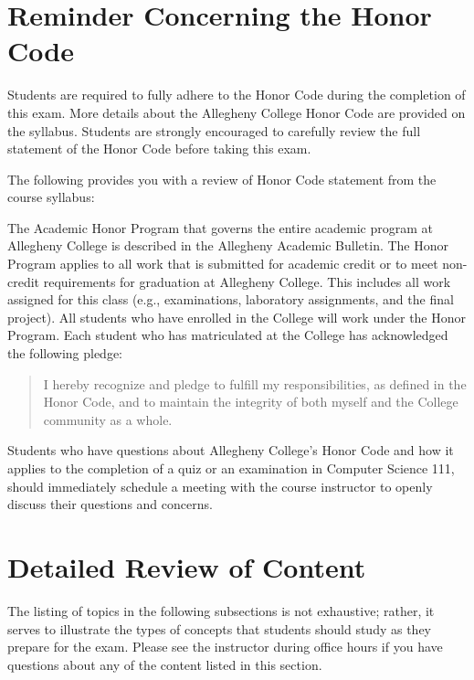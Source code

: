 \documentclass[11pt]{article}
\begin{document}
\section*{Reminder Concerning the Honor Code}

\noindent Students are required to fully adhere to the Honor Code during the completion of this exam. More details about
the Allegheny College Honor Code are provided on the syllabus. Students are strongly encouraged to carefully review the
full statement of the Honor Code before taking this exam.

\noindent The following provides you with a review of Honor Code statement from the course syllabus:

The Academic Honor Program that governs the entire academic program at Allegheny College is described in the Allegheny
Academic Bulletin. The Honor Program applies to all work that is submitted for academic credit or to meet non-credit
requirements for graduation at Allegheny College. This includes all work assigned for this class (e.g., examinations,
laboratory assignments, and the final project). All students who have enrolled in the College will work under the Honor
Program.  Each student who has matriculated at the College has acknowledged the following pledge:

\begin{quote}
  I hereby recognize and pledge to fulfill my responsibilities, as defined in the Honor Code, and to maintain the
  integrity of both myself and the College community as a whole.
\end{quote}

\noindent Students who have questions about Allegheny College's Honor Code and how it applies to the completion of a
quiz or an examination in Computer Science 111, should immediately schedule a meeting with the course instructor to
openly discuss their questions and concerns.

\section*{Detailed Review of Content}

The listing of topics in the following subsections is not exhaustive; rather, it serves to illustrate the types of
concepts that students should study as they prepare for the exam. Please see the instructor during office hours if you
have questions about any of the content listed in this section.
\end{document}
